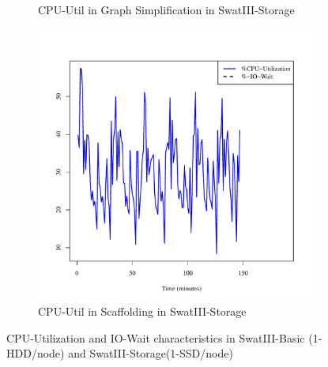 \documentclass[conference]{IEEEtran}
\begin{document}
\begin{figure}[htb]
\begin{subfigure}[b]{0.3\textwidth}
                \caption{CPU-Util in Graph Simplification in SwatIII-Storage}
                \label{fig:ECCPUSSD}
        \end{subfigure}
        \begin{subfigure}[b]{0.3\textwidth}
                \includegraphics[width=\textwidth]{Figure/SystemData/Plots/SCFCPUSSD.pdf}
                \caption{CPU-Util in Scaffolding in SwatIII-Storage}
                \label{fig:SCFCPUSSD}
        \end{subfigure}
        \caption{CPU-Utilization and IO-Wait characteristics in SwatIII-Basic (1-HDD/node) and SwatIII-Storage(1-SSD/node)}\label{fig:HddSsdCPU}
\end{figure}
\end{document}
